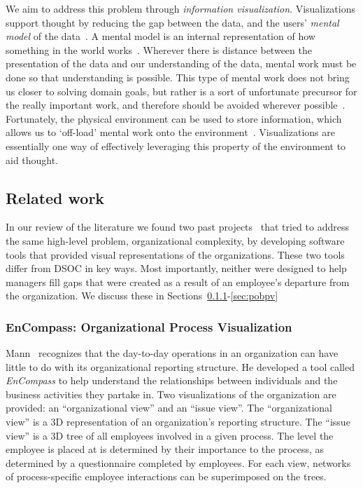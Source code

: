 \documentclass[journal]{vgtc}                %
\begin{document}
We aim to address this problem through \emph{information visualization}. Visualizations support thought by reducing the gap between the data, and the users' \emph{mental model} of the data~\cite{yi2007toward}. A mental model is an internal representation of how something in the world works~\cite{staggersmodel,norman2014some}. Wherever there is distance between the presentation of the data and our understanding of the data, mental work must be done so that understanding is possible. This type of mental work does not bring us closer to solving domain goals, but rather is a sort of unfortunate precursor for the really important work, and therefore should be avoided wherever possible~\cite{paas2003cognitive}. Fortunately, the physical environment can be used to store information, which allows us to \lq off-load\rq{} mental work onto the environment~\cite{wilson2002six}. Visualizations are essentially one way of effectively leveraging this property of the environment to aid thought.

\subsection{Related work}

In our review of the literature we found two past projects~\cite{mann1999organizational,jablonski2007perspective} that tried to address the same high-level problem, organizational complexity, by developing software tools that provided visual representations of the organizations. These two tools differ from DSOC in key ways. Most importantly, neither were designed to help managers fill gaps that were created as a result of an employee's departure from the organization. We discuss these in Sections~\ref{sec:encompass}-\ref{sec:pobpv}

\subsubsection{EnCompass: Organizational Process Visualization}
\label{sec:encompass}

Mann~\cite{mann1999organizational} recognizes that the day-to-day operations in an organization can have little to do with its organizational reporting structure. He developed a tool called \emph{EnCompass} to help understand the relationships between individuals and the business activities they partake in. Two visualizations of the organization are provided: an ``organizational view'' and an ``issue view''. The ``organizational view'' is a 3D representation of an organization's reporting structure. The ``issue view'' is a 3D tree of all employees involved in a given process. The level the employee is placed at is determined by their importance to the process, as determined by a questionnaire completed by employees. For each view, networks of process-specific employee interactions can be superimposed on the trees.
\end{document}
